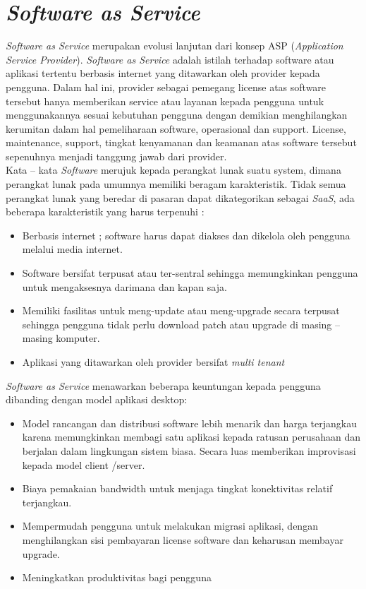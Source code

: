 \section{\textit{Software as Service}}
\tab \textit{Software as Service} merupakan evolusi lanjutan dari konsep ASP (\textit{Application Service Provider}). \textit{Software as Service} adalah istilah terhadap software atau aplikasi tertentu berbasis internet yang ditawarkan oleh provider kepada pengguna. Dalam hal ini, provider sebagai pemegang license atas software tersebut hanya memberikan service atau layanan kepada pengguna untuk menggunakannya sesuai kebutuhan pengguna dengan demikian menghilangkan kerumitan dalam hal pemeliharaan software, operasional dan support. License, maintenance, support, tingkat kenyamanan dan keamanan atas software tersebut sepenuhnya menjadi tanggung jawab dari provider.\\
\tab Kata – kata \textit{Software} merujuk kepada perangkat lunak suatu system, dimana perangkat lunak pada umumnya memiliki beragam karakteristik. Tidak semua perangkat lunak yang beredar di pasaran dapat dikategorikan sebagai \textit{SaaS}, ada beberapa karakteristik yang harus terpenuhi :\\
\begin{itemize}
\item Berbasis internet ; software harus dapat diakses dan dikelola oleh pengguna melalui media internet.
\item Software bersifat terpusat atau ter-sentral sehingga memungkinkan pengguna untuk mengaksesnya darimana dan kapan saja.
\item Memiliki fasilitas untuk meng-update atau meng-upgrade secara terpusat sehingga pengguna tidak perlu download patch atau upgrade di masing – masing komputer.
\item Aplikasi yang ditawarkan oleh provider bersifat \textit{multi tenant}
\end{itemize}
\textit{Software as Service} menawarkan beberapa keuntungan kepada pengguna dibanding dengan model aplikasi desktop:
\begin{itemize}
\item Model rancangan dan distribusi software lebih menarik dan harga terjangkau karena memungkinkan membagi satu aplikasi kepada ratusan perusahaan dan berjalan dalam lingkungan sistem biasa. Secara luas memberikan improvisasi kepada model client /server.
\item Biaya pemakaian bandwidth untuk menjaga tingkat konektivitas relatif terjangkau.
\item Mempermudah pengguna untuk melakukan migrasi aplikasi, dengan menghilangkan sisi pembayaran license software dan keharusan membayar upgrade.
\item Meningkatkan produktivitas bagi pengguna
\end{itemize}

